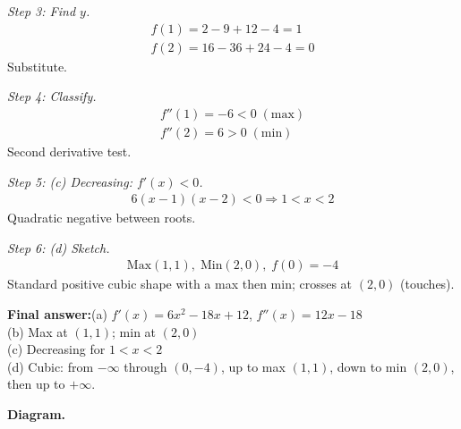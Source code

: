 \documentclass[11pt]{article}
\begin{document}
\textit{Step 3: Find \( y \).}
\[\begin{gathered}
f(1) = 2 - 9 + 12 - 4 = 1 \\ f(2) = 16 - 36 + 24 - 4 = 0
\end{gathered}\]
Substitute.

\textit{Step 4: Classify.}
\[\begin{gathered}
f''(1) = -6 < 0\; (\text{max}) \\ f''(2) = 6 > 0\; (\text{min})
\end{gathered}\]
Second derivative test.

\textit{Step 5: (c) Decreasing: \( f'(x) < 0 \).}
\[\begin{gathered}
6(x - 1)(x - 2) < 0 \Rightarrow 1 < x < 2
\end{gathered}\]
Quadratic negative between roots.

\textit{Step 6: (d) Sketch.}
\[\begin{gathered}
\text{Max}(1, 1),\; \text{Min}(2, 0),\; f(0) = -4
\end{gathered}\]
Standard positive cubic shape with a max then min; crosses at \( (2, 0) \) (touches).

\begin{answerbox}
\textbf{Final answer:}\quad (a) \(\displaystyle  f'(x) = 6x^2 - 18x + 12 \), \(\displaystyle  f''(x) = 12x - 18 \) \\[3pt]  (b) Max at \(\displaystyle  (1, 1) \); min at \(\displaystyle  (2, 0) \) \\[3pt]  (c) Decreasing for \(\displaystyle  1 < x < 2 \) \\[3pt]  (d) Cubic: from \(\displaystyle  -\infty \) through \(\displaystyle  (0, -4) \), up to max \(\displaystyle  (1, 1) \), down to min \(\displaystyle  (2, 0) \), then up to \(\displaystyle  +\infty \).
\end{answerbox}
\textbf{Diagram.}
\end{document}
